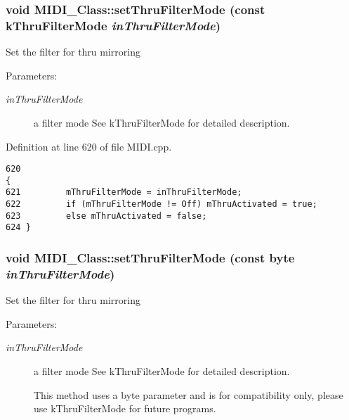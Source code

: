 \hypertarget{class_m_i_d_i___class_33d450180a10a36bef08e68015c4d922}{
\subsubsection[{setThruFilterMode}]{\setlength{\rightskip}{0pt plus 5cm}void MIDI\_\-Class::setThruFilterMode (const {\bf kThruFilterMode} {\em inThruFilterMode})}}
\label{class_m_i_d_i___class_33d450180a10a36bef08e68015c4d922}


Set the filter for thru mirroring \begin{Desc}
\item[Parameters:]
\begin{description}
\item[{\em inThruFilterMode}]a filter mode See kThruFilterMode for detailed description. \end{description}
\end{Desc}


Definition at line 620 of file MIDI.cpp.

\begin{Code}\begin{verbatim}620                                                                    { 
621         mThruFilterMode = inThruFilterMode;
622         if (mThruFilterMode != Off) mThruActivated = true;
623         else mThruActivated = false;
624 }
\end{verbatim}
\end{Code}


\hypertarget{class_m_i_d_i___class_be50e76aa11dc7127bd28659c181ab77}{
\subsubsection[{setThruFilterMode}]{\setlength{\rightskip}{0pt plus 5cm}void MIDI\_\-Class::setThruFilterMode (const {\bf byte} {\em inThruFilterMode})}}
\label{class_m_i_d_i___class_be50e76aa11dc7127bd28659c181ab77}


Set the filter for thru mirroring \begin{Desc}
\item[Parameters:]
\begin{description}
\item[{\em inThruFilterMode}]a filter mode See kThruFilterMode for detailed description. \par
 This method uses a byte parameter and is for compatibility only, please use kThruFilterMode for future programs. \end{description}
\end{Desc}



